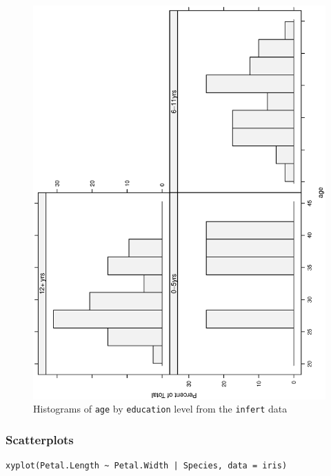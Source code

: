 \documentclass[captions=tableheading]{scrbook}
\begin{document}
\begin{figure}[th]
  \includegraphics[angle=270, totalheight=4in]{ps/datadesc/histograms-lattice.ps}
  \caption[Histograms of \texttt{age} by \texttt{education} level]{Histograms of \texttt{age} by \texttt{education} level from the \texttt{infert} data}
  \label{fig-histograms-lattice}
\end{figure}
\subsubsection{Scatterplots}
\label{sec-3-6-3-3}



\lstset{language=R}
\begin{lstlisting}
xyplot(Petal.Length ~ Petal.Width | Species, data = iris)
\end{lstlisting}
\end{document}
